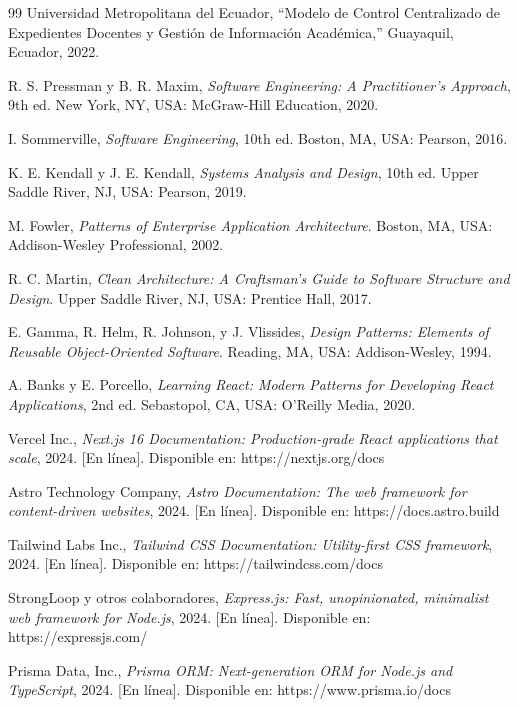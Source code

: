 \begin{thebibliography}{99}
Universidad Metropolitana del Ecuador, ``Modelo de Control Centralizado de Expedientes Docentes y Gestión de Información Académica,'' Guayaquil, Ecuador, 2022.

R. S. Pressman y B. R. Maxim, \textit{Software Engineering: A Practitioner's Approach}, 9th ed. New York, NY, USA: McGraw-Hill Education, 2020.

I. Sommerville, \textit{Software Engineering}, 10th ed. Boston, MA, USA: Pearson, 2016.

K. E. Kendall y J. E. Kendall, \textit{Systems Analysis and Design}, 10th ed. Upper Saddle River, NJ, USA: Pearson, 2019.

M. Fowler, \textit{Patterns of Enterprise Application Architecture}. Boston, MA, USA: Addison-Wesley Professional, 2002.

R. C. Martin, \textit{Clean Architecture: A Craftsman's Guide to Software Structure and Design}. Upper Saddle River, NJ, USA: Prentice Hall, 2017.

E. Gamma, R. Helm, R. Johnson, y J. Vlissides, \textit{Design Patterns: Elements of Reusable Object-Oriented Software}. Reading, MA, USA: Addison-Wesley, 1994.

A. Banks y E. Porcello, \textit{Learning React: Modern Patterns for Developing React Applications}, 2nd ed. Sebastopol, CA, USA: O'Reilly Media, 2020.

Vercel Inc., \textit{Next.js 16 Documentation: Production-grade React applications that scale}, 2024. [En línea]. Disponible en: https://nextjs.org/docs

Astro Technology Company, \textit{Astro Documentation: The web framework for content-driven websites}, 2024. [En línea]. Disponible en: https://docs.astro.build

Tailwind Labs Inc., \textit{Tailwind CSS Documentation: Utility-first CSS framework}, 2024. [En línea]. Disponible en: https://tailwindcss.com/docs

StrongLoop y otros colaboradores, \textit{Express.js: Fast, unopinionated, minimalist web framework for Node.js}, 2024. [En línea]. Disponible en: https://expressjs.com/

Prisma Data, Inc., \textit{Prisma ORM: Next-generation ORM for Node.js and TypeScript}, 2024. [En línea]. Disponible en: https://www.prisma.io/docs


\end{thebibliography}
